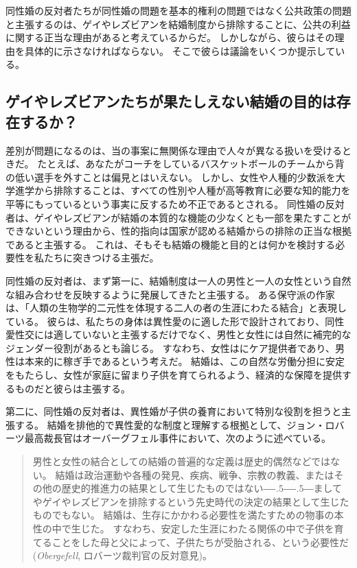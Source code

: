 \documentclass[paper=a4,book,openany]{jlreq}
\newcommand{\ig}[1]{}           %
\def\DDASH{―\kern-.5\zw―\kern-.5\zw―} %
\begin{document}
同性婚の反対者たちが同性婚の問題を基本的権利の問題ではなく公共政策の問題と主張するのは、ゲイやレズビアンを結婚制度から排除することに、公共の利益に関する正当な理由があると考えているからだ。
しかしながら、彼らはその理由を具体的に示さなければならない。
そこで彼らは議論をいくつか提示している。

\subsection{ゲイやレズビアンたちが果たしえない結婚の目的は存在するか？}

差別が問題になるのは、当の事案に無関係な理由で人々が異なる扱いを受けるときだ。
たとえば、あなたがコーチをしているバスケットボールのチームから背の低い選手を外すことは偏見とはいえない。
しかし、女性や人種的少数派を大学進学から排除することは、すべての性別や人種が高等教育に必要な知的能力を平等にもっているという事実に反するため不正であるとされる。
同性婚の反対者は、ゲイやレズビアンが結婚の本質的な機能の少なくとも一部を果たすことができないという理由から、性的指向は国家が認める結婚からの排除の正当な根拠であると主張する。
これは、そもそも結婚の機能と目的とは何かを検討する必要性を私たちに突きつける主張だ。

同性婚の反対者は、まず第一に、結婚制度は一人の男性と一人の女性という自然な組み合わせを反映するように発展してきたと主張する。
ある保守派の作家は、「人類の生物学的二元性を体現する二人の者の生涯にわたる結合」と表現している\citep{jensen15:_i_oppos_same_sex_marriag}。
彼らは、私たちの身体は異性愛のに適した形で設計されており、同性愛性交には適していないと主張するだけでなく、男性と女性には自然に補完的なジェンダー役割があるとも論じる。
すなわち、女性はにケア提供者であり、男性は本来的に稼ぎ手であるという考えだ。
結婚は、この自然な労働分担に安定をもたらし、女性が家庭に留まり子供を育てられるよう、経済的な保障を提供するものだと彼らは主張する。

第二に、同性婚の反対者は、異性婚が子供の養育において特別な役割を担うと主張する。
結婚を排他的で異性愛的な制度と理解する根拠として、ジョン・ロバーツ\ig{John Roberts}最高裁長官はオーバーグフェル事件において、次のように述べている。

\begin{quote}
男性と女性の結合としての結婚の普遍的な定義は歴史的偶然などではない。
結婚は政治運動や各種の発見、疾病、戦争、宗教の教義、またはその他の歴史的推進力の結果として生じたものではない{\DDASH}ましてやゲイやレズビアンを排除するという先史時代の決定の結果として生じたものでもない。
結婚は、生存にかかわる必要性を満たすための物事の本性の中で生じた。
すなわち、安定した生涯にわたる関係の中で子供を育てることをした母と父によって、子供たちが受胎される、という必要性だ(\emph{Obergefell}, ロバーツ裁判官の反対意見)\ig{John Roberts}。

\end{quote}
\end{document}
